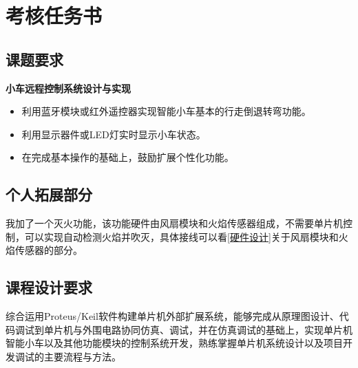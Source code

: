 \section{考核任务书}
\subsection{课题要求}
\textbf{小车远程控制系统设计与实现}
\begin{itemize}
    \item 利用蓝牙模块或红外遥控器实现智能小车基本的行走倒退转弯功能。
    \item 利用显示器件或LED灯实时显示小车状态。
    \item 在完成基本操作的基础上，鼓励扩展个性化功能。
\end{itemize}
\subsection{个人拓展部分}
我加了一个灭火功能，该功能硬件由风扇模块和火焰传感器组成，不需要单片机控制，可以实现自动检测火焰并吹灭，具体接线可以看\autoref{硬件设计}关于风扇模块和火焰传感器的部分。
\subsection{课程设计要求}
综合运用Proteus/Keil软件构建单片机外部扩展系统，能够完成从原理图设计、代码调试到单片机与外围电路协同仿真、调试，并在仿真调试的基础上，实现单片机智能小车以及其他功能模块的控制系统开发，熟练掌握单片机系统设计以及项目开发调试的主要流程与方法。



